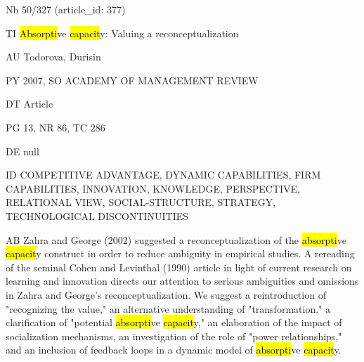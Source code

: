 \documentclass[a4paper]{article}
\begin{document}
\vspace*{-2cm}
Nb \tabto{0cm}50/327 (article\_id: 377)\par
TI \tabto{0cm}\hl{Absorpti}ve \hl{capacit}y: Valuing a reconceptualization\par
AU \tabto{0cm}Todorova, Durisin\par
PY \tabto{0cm}2007, SO ACADEMY OF MANAGEMENT REVIEW\par
DT \tabto{0cm}Article\par
PG \tabto{0cm}13, NR 86, TC 286\par
DE \tabto{0cm}null\par
ID \tabto{0cm}COMPETITIVE ADVANTAGE, DYNAMIC CAPABILITIES, FIRM CAPABILITIES, INNOVATION, KNOWLEDGE, PERSPECTIVE, RELATIONAL VIEW, SOCIAL-STRUCTURE, STRATEGY, TECHNOLOGICAL DISCONTINUITIES\par
AB \tabto{0cm}Zahra and George (2002) suggested a reconceptualization of the \hl{absorpti}ve \hl{capacit}y construct in order to reduce ambiguity in empirical studies. A rereading of the seminal Cohen and Levinthal (1990) article in light of current research on learning and innovation directs our attention to serious ambiguities and omissions in Zahra and George's reconceptualization. We suggest a reintroduction of "recognizing the value," an alternative understanding of "transformation." a clarification of "potential \hl{absorpti}ve \hl{capacit}y," an elaboration of the impact of socialization mechanisms, an investigation of the role of "power relationships," and an inclusion of feedback loops in a dynamic model of \hl{absorpti}ve \hl{capacit}y.\par
\clearpage
\end{document}
